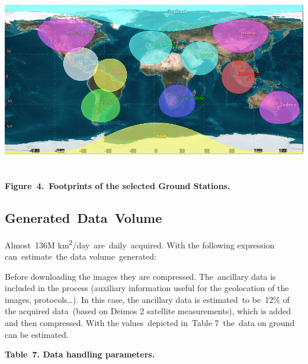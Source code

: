 \documentclass[a4paper]{article}
\begin{document}
\bigskip

{\centering 
\includegraphics[width=6.29861in,height=3.14931in]{out-img8.png} \par}

{\centering\bfseries
\label{bkm:Ref377044167}Figure\ 4.\ Footprints of the selected Ground
Stations.
\par}


\bigskip

\subsection[Generated\ Data\ Volume]{Generated\ Data\ Volume}
\hypertarget{Toc381777190}{}Almost\ 136M
km\textsuperscript{2}/day\ are\ daily\ acquired. With the following
expression can\ estimate\ the data volume\ generated:

{\centering \par}

Before downloading the images they are compressed. The\ ancillary data
is included in the process (auxiliary information useful for the
geolocation of the images, protocols{\dots}). In this case, the
ancillary data is estimated\ to be\ 12\% of the acquired data\ (based
on Deimos 2 satellite measurements), which is added and then
compressed. With the values\ depicted in\ Table 7\ the\ data on ground
can be estimated.


\bigskip

{\centering\bfseries
\label{bkm:Ref377044461}Table\ 7. Data handling parameters.
\par}
\end{document}
